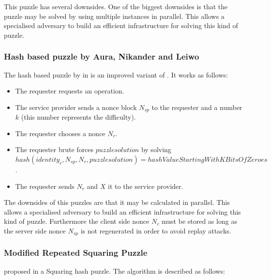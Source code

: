 This puzzle has several downsides. One of the biggest downsides is that the puzzle may be solved by using multiple instances in parallel. This allows a specialised adversary to build an efficient infrastructure for solving this kind of puzzle.

\subsubsection{Hash based puzzle by Aura, Nikander and Leiwo} 
The hash based puzzle by \citeauthor{aura2000resistant} in \cite{aura2000resistant} is an improved variant of \cite{juels1999client}. It works as follows:

\begin{itemize}
	\item The requester requests an operation.
	\item The service provider sends a nonce block $N_{sp}$ to the requester and a number $k$ (this number represents the difficulty).
	\item The requester chooses a nonce $N_{r}$.
	\item The requester brute forces  $puzzlesolution$ by solving $hash(identity_r, N_{sp}, N_{r}, puzzlesolution)=hashValueStartingWithKBitsOfZeroes$.
	\item The requester sends $N_r$ and $X$ it to the service provider.
\end{itemize}

The downsides of this puzzles are that it may be calculated in parallel. This allows a specialised adversary to build an efficient infrastructure for solving this kind of puzzle. Furthermore the client side nonce $N_r$ must be stored as long as the server side nonce $N_{sp}$ is not regenerated in order to avoid replay attacks.

\subsubsection{Modified Repeated Squaring Puzzle} 
\citeauthor{jeckmans2009practical} proposed in \cite{jeckmans2009practical} a Squaring hash puzzle. The algorithm is described as follows:

